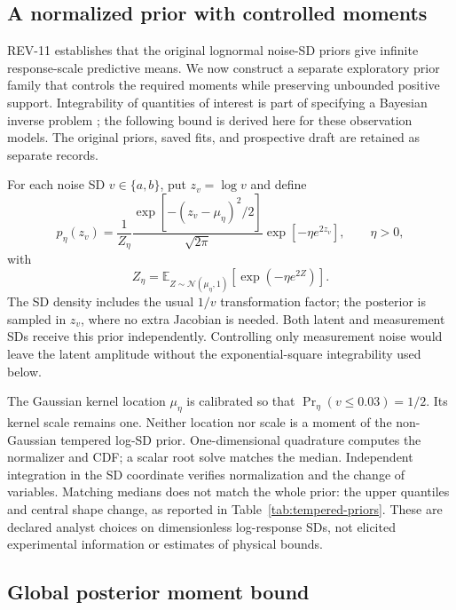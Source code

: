 \label{sec:tempered-noise}
\subsection{A normalized prior with controlled moments}

    REV-11 establishes that the original lognormal noise-SD priors give
    infinite response-scale predictive means. We now construct a separate
    exploratory prior family that controls the required moments while
    preserving unbounded positive support. Integrability of quantities of
    interest is part of specifying a Bayesian inverse problem
    \citep{stuart2010inverse}; the following bound is derived here for these
    observation models. The original priors, saved fits, and prospective
    draft are retained as separate records.

    For each noise SD \(v\in\{a,b\}\), put \(z_v=\log v\) and define
    \[
        p_\eta(z_v)
        =\frac{1}{Z_\eta}
            \frac{\exp[-(z_v-\mu_\eta)^2/2]}{\sqrt{2\pi}}
            \exp[-\eta e^{2z_v}],\qquad \eta>0,
    \]
    with
    \[
        Z_\eta
        =\mathbb E_{Z\sim\mathcal N(\mu_\eta,1)}
            [\exp(-\eta e^{2Z})].
    \]
    The SD density includes the usual \(1/v\) transformation factor; the
    posterior is sampled in \(z_v\), where no extra Jacobian is needed.
    Both latent and measurement SDs receive this prior independently.
    Controlling only measurement noise would leave the latent amplitude
    without the exponential-square integrability used below.

    The Gaussian kernel location \(\mu_\eta\) is calibrated so that
    \(\Pr_\eta(v\le0.03)=1/2\). Its kernel scale remains one. Neither
    location nor scale is a moment of the non-Gaussian tempered log-SD
    prior. One-dimensional quadrature computes the normalizer and CDF;
    a scalar root solve matches the median. Independent integration in the
    SD coordinate verifies normalization and the change of variables.
    Matching medians does not match the whole prior: the upper quantiles
    and central shape change, as reported in Table~\ref{tab:tempered-priors}.
    These are declared analyst choices on dimensionless log-response SDs,
    not elicited experimental information or estimates of physical bounds.

\subsection{Global posterior moment bound}


